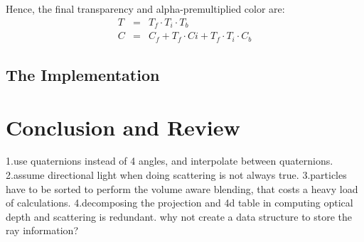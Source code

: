Hence, the final transparency and alpha-premultiplied color are:
\begin{eqnarray}
T &=& T_f\cdot T_i\cdot T_b\\
C &=& C_f + T_f \cdot Ci + T_f \cdot T_i \cdot C_b
\end{eqnarray}

\subsection{The Implementation}



\section{Conclusion and Review}
1.use quaternions instead of 4 angles, and interpolate between quaternions.
2.assume directional light when doing scattering is not always true.
3.particles have to be sorted to perform the volume aware blending, that costs a heavy load of calculations.
4.decomposing the projection and 4d table in computing optical depth and scattering is redundant. why not create a data structure to store the ray information?